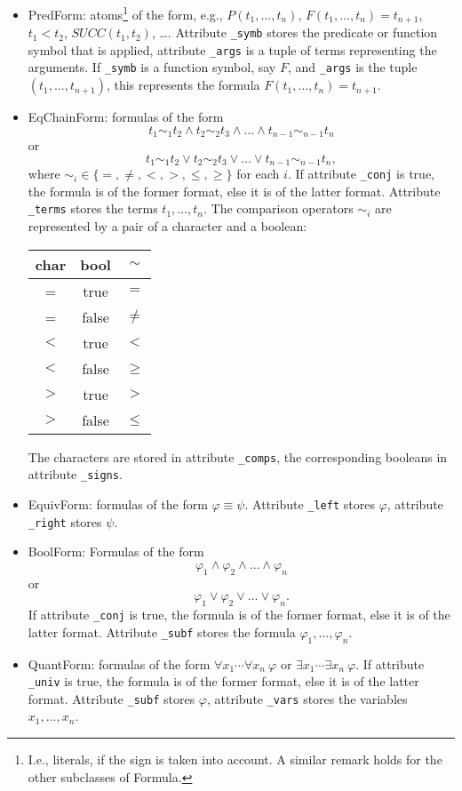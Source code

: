 \documentclass{article}
\begin{document}
\begin{itemize}
	\item PredForm: atoms\footnote{I.e., literals, if the sign is taken into account. A similar remark holds for the other subclasses of Formula.} of the form, e.g., $P(t_1,\ldots,t_n)$, $F(t_1,\ldots,t_n) = t_{n+1}$, $t_1 < t_2$, $SUCC(t_1,t_2)$, \ldots. Attribute \texttt{\_symb} stores the predicate or function symbol that is applied, attribute \texttt{\_args} is a tuple of terms representing the arguments. If \texttt{\_symb} is a function symbol, say $F$, and \texttt{\_args} is the tuple $(t_1, \ldots, t_{n+1})$, this represents the formula $F(t_1,\ldots,t_n) = t_{n+1}$.
	\item EqChainForm: formulas of the form 
		\[ t_1 \sim_1 t_2 \land t_2 \sim_2 t_3 \land \ldots \land t_{n-1} \sim_{n-1} t_n  \]
		or
		\[ t_1 \sim_1 t_2 \lor t_2 \sim_2 t_3 \lor \ldots \lor t_{n-1} \sim_{n-1} t_n,  \]
		where $\sim_i \in \{ =, \neq, <, >, \leq, \geq \}$ for each $i$. If attribute \texttt{\_conj} is true, the formula is of the former format, else it is of the latter format. Attribute \texttt{\_terms} stores the terms $t_1,\ldots,t_n$. The comparison operators $\sim_i$ are represented by a pair of a character and a boolean:
		\begin{center}
			\begin{tabular}{cc|c}
				char & bool & $\sim$ \\
				\hline
				= & true & $=$ \\
				= & false & $\neq$ \\
				$<$ & true & $<$ \\
				$<$ & false & $\geq$ \\
				$>$ & true & $>$ \\
				$>$ & false & $\leq$ 
			\end{tabular}
		\end{center}
		The characters are stored in attribute \texttt{\_comps}, the corresponding booleans in attribute \texttt{\_signs}.
	\item EquivForm: formulas of the form $\varphi \equiv \psi$. Attribute \texttt{\_left} stores $\varphi$, attribute \texttt{\_right} stores $\psi$.
	\item BoolForm: Formulas of the form
		\[ \varphi_1 \land \varphi_2 \land \ldots \land \varphi_n \]
		or
		\[ \varphi_1 \lor \varphi_2 \lor \ldots \lor \varphi_n. \]
		If attribute \texttt{\_conj} is true, the formula is of the former format, else it is of the latter format. Attribute \texttt{\_subf} stores the formula $\varphi_1,\ldots,\varphi_n$.
	\item QuantForm: formulas of the form $\forall x_1 \cdots \forall x_n\ \varphi$ or $\exists x_1 \cdots \exists x_n\ \varphi$. If attribute \texttt{\_univ} is true, the formula is of the former format, else it is of the latter format. Attribute \texttt{\_subf} stores $\varphi$, attribute \texttt{\_vars} stores the variables $x_1,\ldots,x_n$.
\end{itemize}
\end{document}

